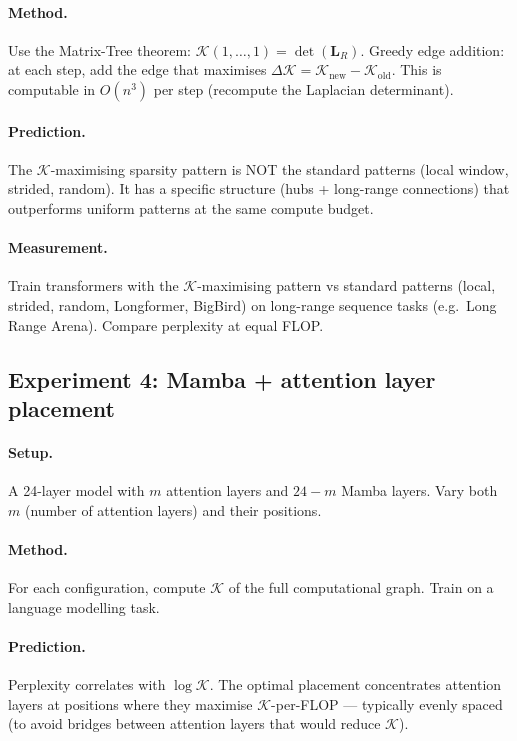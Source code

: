 \documentclass[11pt,a4paper]{article}
\newcommand{\K}{\mathcal{K}}
\begin{document}
\paragraph{Method.}
Use the Matrix-Tree theorem: $\K(1, \ldots, 1) = \det(\mathbf{L}_R)$.
Greedy edge addition: at each step, add the edge that maximises
$\Delta \K = \K_{\text{new}} - \K_{\text{old}}$.  This is computable
in $O(n^3)$ per step (recompute the Laplacian determinant).

\paragraph{Prediction.}
The $\K$-maximising sparsity pattern is NOT the standard patterns
(local window, strided, random). It has a specific structure
(hubs + long-range connections) that outperforms uniform patterns
at the same compute budget.

\paragraph{Measurement.}
Train transformers with the $\K$-maximising pattern vs standard
patterns (local, strided, random, Longformer, BigBird) on long-range
sequence tasks (e.g.\ Long Range Arena).  Compare perplexity at
equal FLOP.

\subsection{Experiment 4: Mamba + attention layer placement}

\paragraph{Setup.}
A 24-layer model with $m$ attention layers and $24 - m$ Mamba layers.
Vary both $m$ (number of attention layers) and their positions.

\paragraph{Method.}
For each configuration, compute $\K$ of the full computational graph.
Train on a language modelling task.

\paragraph{Prediction.}
Perplexity correlates with $\log \K$.  The optimal placement
concentrates attention layers at positions where they maximise
$\K$-per-FLOP --- typically evenly spaced (to avoid bridges between
attention layers that would reduce $\K$).
\end{document}

